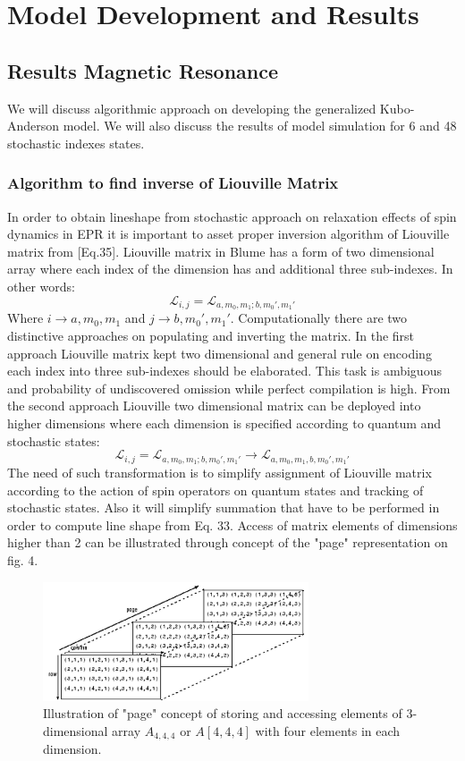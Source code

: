 \chapter{Model Development and Results}
\section{Results Magnetic Resonance}
We will discuss algorithmic approach on developing the generalized Kubo-Anderson model. We will also discuss the results of model simulation for 6 and 48 stochastic indexes states.  
\subsection{Algorithm to find inverse of Liouville Matrix}
In order to obtain lineshape from stochastic approach on relaxation effects of spin dynamics in EPR it is important to asset proper inversion algorithm of Liouville matrix from [Eq.35]. Liouville matrix in Blume has a form of two dimensional array where each index of the dimension has and additional three sub-indexes. In other words: 
\begin{equation}\label{eq:53}
\mathcal{L}_{i,j}=\mathcal{L}_{a,m_0,m_1;b,m_0',m_1'}  
\end{equation}  
Where $i\rightarrow a,m_0,m_1$ and $j\rightarrow b,m_0',m_1'$. Computationally there are two distinctive approaches on populating and inverting the matrix. In the first approach Liouville matrix kept two dimensional and general rule on encoding each index into three sub-indexes should be elaborated. This task is ambiguous and probability of undiscovered omission while perfect compilation is high. From the second approach Liouville two dimensional matrix can be deployed into higher dimensions where each dimension is specified according to quantum and stochastic states:  
\begin{equation}\label{eq:54}
\mathcal{L}_{i,j}=\mathcal{L}_{a,m_0,m_1;b,m_0',m_1'}\rightarrow \mathcal{L}_{a,m_0,m_1,b,m_0',m_1'}
\end{equation}
The need of such transformation is to simplify assignment of Liouville matrix according to the action of spin operators on quantum states and tracking of stochastic states. Also it will simplify summation that have to be performed in order to compute line shape from Eq. 33. Access of matrix elements of dimensions higher than 2 can be illustrated through concept of the "page" representation on fig. 4. 
\begin{figure}[h!]
\centering
\includegraphics[width=0.7\textwidth]{figures/chap1/mat.png}
\caption{Illustration of "page" concept of storing and accessing elements of 3-dimensional array $A_{4,4,4}$ or $A[4,4,4]$ with four elements in each dimension.~\cite{Matlab}}
\end{figure}
